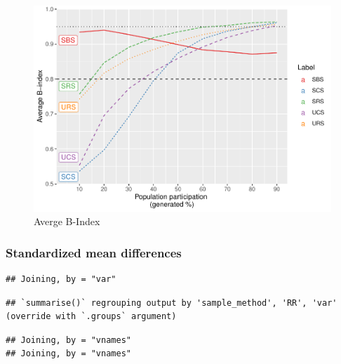 \documentclass[
  english,
  man,floatsintext]{apa6}
\begin{document}
\begin{figure}
\centering
\includegraphics{5---Analysis_files/figure-latex/unnamed-chunk-14-1.pdf}
\caption{\label{fig:unnamed-chunk-14}Averge B-Index}
\end{figure}

\hypertarget{standardized-mean-differences}{%
\subsubsection{Standardized mean differences}\label{standardized-mean-differences}}

\begin{verbatim}
## Joining, by = "var"
\end{verbatim}

\begin{verbatim}
## `summarise()` regrouping output by 'sample_method', 'RR', 'var' (override with `.groups` argument)
\end{verbatim}

\begin{verbatim}
## Joining, by = "vnames"
## Joining, by = "vnames"
\end{verbatim}
\end{document}
